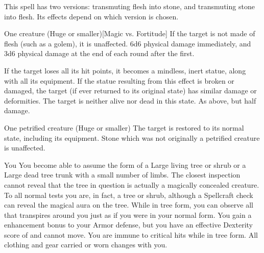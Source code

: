 \begin{spellheader}
    \spellrng{\rngmed}
\end{spellheader}
\begin{spelleffects}
    \spellspecial This spell has two versions: transmuting flesh into stone, and transmuting stone into flesh. Its effects depend on which version is chosen.
    \begin{spelltarget}{One creature (Huge or smaller)}[Magic vs. Fortitude]
        \spellspecial If the target is not made of flesh (such as a golem), it is unaffected.
        \spellsuccess 6d6 physical damage immediately, and 3d6 physical damage at the end of each round after the first.

        If the target loses all its hit points, it becomes a mindless, inert statue, along with all its equipment. If the statue resulting from this effect is broken or damaged, the target (if ever returned to its original state) has similar damage or deformities. The target is neither alive nor dead in this state.
        \spellfailure As above, but half damage.
    \end{spelltarget}

    \begin{spelltarget}{One petrified creature (Huge or smaller)}
        \spellsuccess The target is restored to its normal state, including its equipment. Stone which was not originally a petrified creature is unaffected.
    \end{spelltarget}
\end{spelleffects}
\begin{spellfooter}
    
\end{spellfooter}

\begin{spellheader}
    \spelldur{\durext \dismissable}
\end{spellheader}
\begin{spelleffects}
    \begin{spelltarget}{You}
        \spelleffect You become able to assume the form of a Large living tree or shrub or a Large dead tree trunk with a small number of limbs. The closest inspection cannot reveal that the tree in question is actually a magically concealed creature. To all normal tests you are, in fact, a tree or shrub, although a Spellcraft check can reveal the magical aura on the tree. While in tree form, you can observe all that transpires around you just as if you were in your normal form. You gain a  enhancement bonus to your Armor defense, but you have an effective Dexterity score of  and cannot move. You are immune to critical hits while in tree form. All clothing and gear carried or worn changes with you.
    \end{spelltarget}
\end{spelleffects}
\begin{spellfooter}
    
\end{spellfooter}


